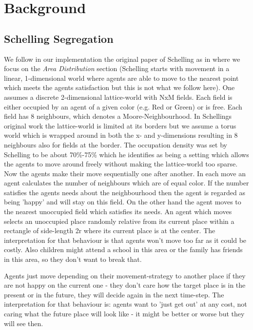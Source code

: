 \section{Background}

\subsection{Schelling Segregation}
We follow in our implementation the original paper of Schelling as in \cite{schelling_dynamic_1971} where we focus on the \textit{Area Distribution} section (Schelling starts with movement in a linear, 1-dimensional world where agents are able to move to the nearest point which meets the agents satisfaction but this is not what we follow here). One assumes a discrete 2-dimensional lattice-world with NxM fields. Each field is either occupied by an agent of a given color (e.g. Red or Green) or is free. Each field has 8 neighbours, which denotes a Moore-Neighbourhood. In Schellings original work the lattice-world is limited at its borders but we assume a torus world which is wrapped around in both the x- and y-dimensions resulting in 8 neighbours also for fields at the border. The occupation density was set by Schelling to be about 70\%-75\% which he identifies as being a setting which allows the agents to move around freely without making the lattice-world too sparse.
Now the agents make their move sequentially one after another. In each move an agent calculates the number of neighbours which are of equal color. If the number satisfies the agents needs about the neighbourhood then the agent is regarded as being 'happy' and will stay on this field. On the other hand the agent moves to the nearest unoccupied field which satisfies its needs. An agent which moves selects an unoccupied place randomly relative from its current place within a rectangle of side-length 2r where its current place is at the center. The interpretation for that behaviour is that agents won't move too far as it could be costly. Also children might attend a school in this area or the family has friends in this area, so they don't want to break that.



Agents just move depending on their movement-strategy to another place if they are not happy on the current one - they don't care how the target place is in the present or in the future, they will decide again in the next time-step. The interpretation for that behaviour is: agents want to 'just get out' at any cost, not caring what the future place will look like - it might be better or worse but they will see then.

